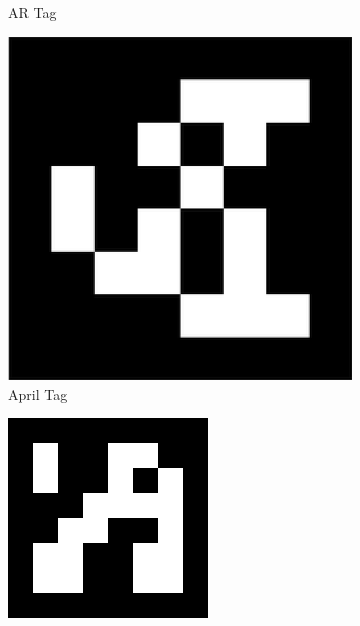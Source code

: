 \begin{figure}[ht]
\begin{subfigure}[b]{0.16\textwidth}
        \caption{AR Tag}
        \label{subfig:ar_tag}
    \end{subfigure}
    \begin{subfigure}[b]{0.16\textwidth}
        \centering
        \includegraphics[width=\textwidth]{images/apriltag_example_cropped.png}
        \caption{April Tag}
        \label{subfig:apriltag}
    \end{subfigure}
    \begin{subfigure}[b]{0.16\textwidth}
        \centering
        \includegraphics[width=\textwidth]{images/aruco.png}

\end{subfigure}
\end{figure}
